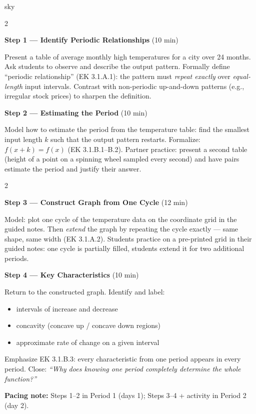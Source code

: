 \documentclass[10pt]{article}
\begin{document}
\begin{skillbox}{sky}
\begin{multicols}{2}

\textbf{Step 1 --- Identify Periodic Relationships} (10 min)

Present a table of average monthly high temperatures for a city over
24 months. Ask students to observe and describe the output pattern.
Formally define ``periodic relationship'' (EK 3.1.A.1): the pattern must
\emph{repeat exactly} over \emph{equal-length} input intervals.
Contrast with non-periodic up-and-down patterns (e.g., irregular stock prices)
to sharpen the definition.

\columnbreak

\textbf{Step 2 --- Estimating the Period} (10 min)

Model how to estimate the period from the temperature table: find the
smallest input length $k$ such that the output pattern restarts.
Formalize: $f(x+k)=f(x)$ (EK 3.1.B.1--B.2).
Partner practice: present a second table (height of a point on a spinning
wheel sampled every second) and have pairs estimate the period and
justify their answer.

\end{multicols}

\begin{multicols}{2}

\textbf{Step 3 --- Construct Graph from One Cycle} (12 min)

Model: plot one cycle of the temperature data on the coordinate grid in the
guided notes. Then \emph{extend} the graph by repeating the cycle exactly ---
same shape, same width (EK 3.1.A.2). Students practice on a pre-printed
grid in their guided notes: one cycle is partially filled, students
extend it for two additional periods.

\columnbreak

\textbf{Step 4 --- Key Characteristics} (10 min)

Return to the constructed graph. Identify and label:
\begin{itemize}[leftmargin=1em, itemsep=1pt]
  \item intervals of increase and decrease
  \item concavity (concave up / concave down regions)
  \item approximate rate of change on a given interval
\end{itemize}
Emphasize EK 3.1.B.3: every characteristic from one period appears in
every period. Close: \textit{``Why does knowing one period completely
determine the whole function?''}

\end{multicols}

\smallskip
\textbf{Pacing note:} Steps 1--2 in Period 1 (days 1);
Steps 3--4 + activity in Period 2 (day 2).
\end{skillbox}
\end{document}
